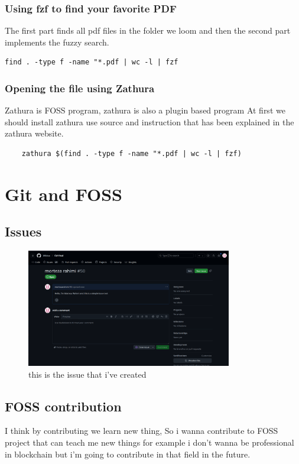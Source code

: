 \documentclass[30px]{article}
\begin{document}
\subsubsection{Using fzf to find your favorite PDF}
The first part finds all pdf files in the folder we loom and then the second part implements the fuzzy search.
\begin{verbatim}
find . -type f -name "*.pdf | wc -l | fzf
\end{verbatim}
\subsubsection{Opening the file using Zathura}
Zathura is FOSS program, zathura is also a plugin based program
\newline At first we should install zathura use source and instruction that has been explained in the zathura website.
\begin{verbatim}
    zathura $(find . -type f -name "*.pdf | wc -l | fzf)
\end{verbatim}

\section{Git and FOSS}
\subsection{Issues}
\begin{figure}
    \centering
    \includegraphics[width=0.8\textwidth]{./issue.jpg}
    \caption{this is the issue that i've created}
\end{figure}
\newpag
\subsection{FOSS contribution}
I think by contributing we learn new thing, So i wanna contribute to FOSS project that can teach me new things for example i don't wanna be professional in blockchain but i'm going to contribute in that field in the future.
\end{document}
